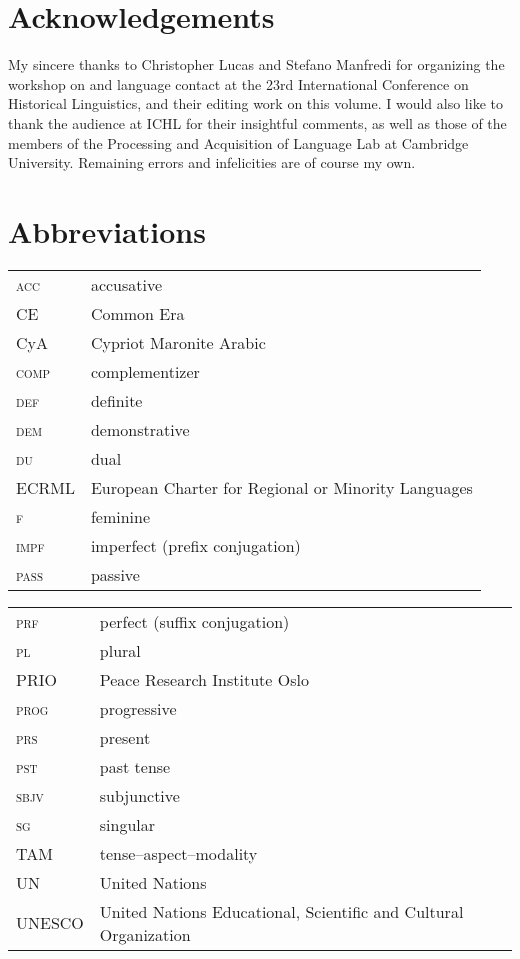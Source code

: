 \documentclass[output=paper]{langsci/langscibook}
\begin{document}
\section*{Acknowledgements}
My sincere thanks to Christopher Lucas and Stefano Manfredi for organizing the workshop on  and language contact at the 23rd International Conference on Historical Linguistics, and their editing work on this volume. I would also like to thank the audience at ICHL for their insightful comments, as well as those of the members of the Processing and Acquisition of Language Lab at Cambridge University. Remaining errors and infelicities are of course my own.

\section*{Abbreviations}
\begin{tabularx}{.5\textwidth}{@{}lQ@{}}
\textsc{acc} & accusative\\
CE & Common Era\\
CyA & Cypriot Maronite Arabic\\
\textsc{comp} & {complementizer}\\
\textsc{def} & {definite}\\
\textsc{dem} & demonstrative\\
\textsc{du} & dual\\
ECRML & European Charter for Regional or Minority Languages\\
\textsc{f} & feminine\\
\textsc{impf} & imperfect (prefix conjugation)\\
\textsc{pass} & {passive}\\
\end{tabularx}%
\begin{tabularx}{.5\textwidth}{@{}lQ@{}}
\textsc{prf} & perfect (suffix conjugation)\\
\textsc{pl} & plural\\
PRIO & Peace Research Institute Oslo\\
\textsc{prog} & progressive \\
\textsc{prs} & present\\
\textsc{pst} & past {tense}\\
\textsc{sbjv} & subjunctive\\
\textsc{sg} & singular\\
TAM & tense--aspect--{modality}\\
UN & United Nations\\
UNESCO & United Nations Educational, Scientific and Cultural Organization
\end{tabularx}%


{\sloppy\printbibliography[heading=subbibliography,notkeyword=this]}
\end{document}
